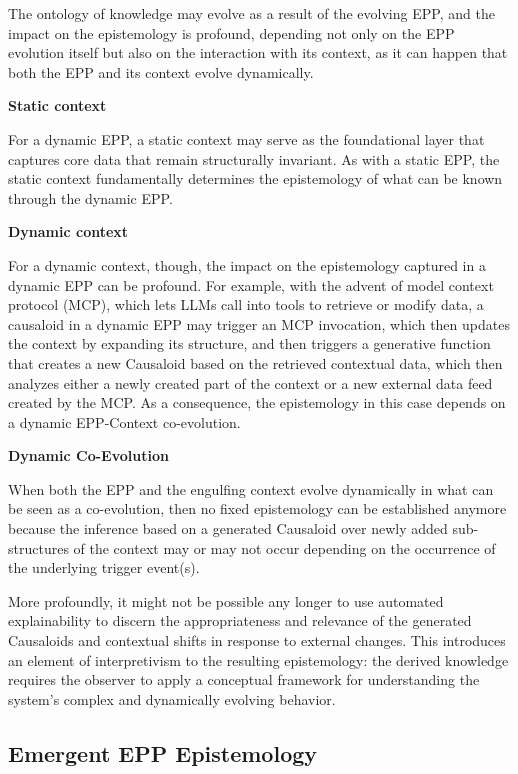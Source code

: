 The ontology of knowledge may evolve as a result of the evolving EPP, and the impact on the epistemology is profound, depending not only on the EPP evolution itself but also on the interaction with its context, as it can happen that both the EPP and its context evolve dynamically.

\textbf{Static context}

For a dynamic EPP, a static context may serve as the foundational layer that captures core data that remain structurally invariant. As with a static EPP, the static context fundamentally determines the epistemology of what can be known through the dynamic EPP.

\textbf{Dynamic context}

For a dynamic context, though, the impact on the epistemology captured in a dynamic EPP can be profound. For example, with the advent of model context protocol (MCP), which lets LLMs call into tools to retrieve or modify data, a causaloid in a dynamic EPP may trigger an MCP invocation, which then updates the context by expanding its structure, and then triggers a generative function that creates a new Causaloid based on the retrieved contextual data, which then analyzes either a newly created part of the context or a new external data feed created by the MCP. As a consequence, the epistemology in this case depends on a dynamic EPP-Context co-evolution.

\textbf{Dynamic Co-Evolution}

When both the EPP and the engulfing context evolve dynamically in what can be seen as a co-evolution, then no fixed epistemology can be established anymore because the inference based on a generated Causaloid over newly added sub-structures of the context may or may not occur depending on the occurrence of the underlying trigger event(s).

More profoundly, it might not be possible any longer to use automated explainability to discern the appropriateness and relevance of the generated Causaloids and contextual shifts in response to external changes. This introduces an element of interpretivism to the resulting epistemology: the derived knowledge requires the observer to apply a conceptual framework for understanding the system's complex and dynamically evolving behavior.

\subsection{Emergent EPP Epistemology}

